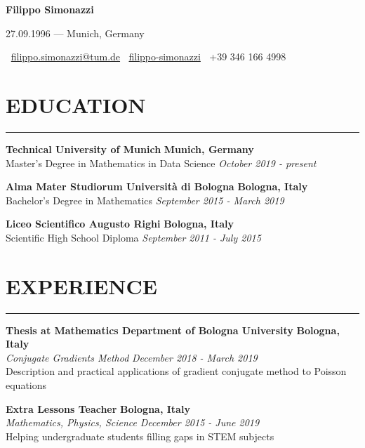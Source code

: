 \documentclass[10pt]{article}
\begin{document}
	\begin{center}
		{\LARGE \textbf{Filippo Simonazzi}}
		
		{\large 27.09.1996 --- Munich, Germany}
		
		\faEnvelope $\:$ \href{mailto:filippo.simonazzi@tum.de}{filippo.simonazzi@tum.de} \qquad
		\faLinkedin $\:$ \href{https://www.linkedin.com/in/filippo-simonazzi}{filippo-simonazzi} \qquad \faMobilePhone $\:$ +39 346 166 4998
	\end{center}
	
	\section*{EDUCATION}
	{\color{darkBlue}\rule{\linewidth}{0.5pt}}
	
	\textbf{Technical University of Munich}
	\hfill
	\textbf{Munich, Germany} \\
	Master's Degree in Mathematics in Data Science
	\hfill
	\textit{October 2019 - present}
	
	\textbf{Alma Mater Studiorum Università di Bologna}
	\hfill
	\textbf{Bologna, Italy} \\
	Bachelor's Degree in Mathematics
	\hfill
	\textit{September 2015 - March 2019}
	
	\textbf{Liceo Scientifico Augusto Righi}
	\hfill
	\textbf{Bologna, Italy} \\
	Scientific High School Diploma
	\hfill
	\textit{September 2011 - July 2015} \\
	
	\section*{EXPERIENCE}
	{\color{darkBlue}\rule{\linewidth}{0.5pt}}
	
	\textbf{Thesis at Mathematics Department of Bologna University}
	\hfill
	\textbf{Bologna, Italy} \\
	\textit{Conjugate Gradients Method}
	\hfill
	\textit{December 2018 - March 2019} \\
	Description and practical applications of gradient conjugate method to  Poisson equations 
	
	\textbf{Extra Lessons Teacher}
	\hfill
	\textbf{Bologna, Italy} \\
	\textit{Mathematics, Physics, Science}
	\hfill
	\textit{December 2015 - June 2019} \\
	Helping undergraduate students filling gaps in STEM subjects 
	
\end{document}
